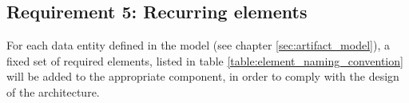     \subsection{Requirement 5: Recurring elements}
    
    For each data entity defined in the model (see chapter \ref{sec:artifact_model}), a
    fixed set of required elements, listed in table \ref{table:element_naming_convention}
    will be added to the appropriate component, in order to comply with the design of the
    architecture.